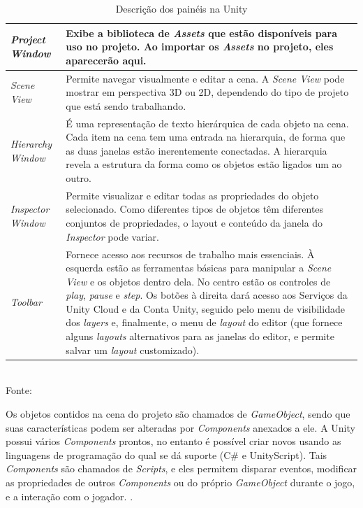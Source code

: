 \documentclass[
	12pt,					%
	openright,				%
	oneside,				%
	a4paper,				%
	bibjustif,				%
	chapter=TITLE,			%
	english,				%
	brazil,					%
	]{abntex2}
\newcommand{\source}[1]{\small Fonte: {#1}}
\begin{document}
			\begin{table}[ht]
				\caption{Descrição dos painéis na Unity}
				\centering
				\small
				\renewcommand{\arraystretch}{1.2} %
				\begin{tabular}{m{3.2cm} m{11.8cm}}
					\hline 
					\textit{Project Window} & Exibe a biblioteca de \textit{Assets} que estão disponíveis para uso no projeto. Ao importar os \textit{Assets} no projeto, eles aparecerão aqui. \\ 
					\hline 
					\textit{Scene View} & Permite navegar visualmente e editar a cena. A \textit{Scene View} pode mostrar em perspectiva 3D ou 2D, dependendo do tipo de projeto que está sendo trabalhando. \\ 
					\hline 
					\textit{Hierarchy Window} & É uma representação de texto hierárquica de cada objeto na cena. Cada item na cena tem uma entrada na hierarquia, de forma que as duas janelas estão inerentemente conectadas. A hierarquia revela a estrutura da forma como os objetos estão ligados um ao outro. \\ 
					\hline 
					\textit{Inspector Window} & Permite visualizar e editar todas as propriedades do objeto selecionado. Como diferentes tipos de objetos têm diferentes conjuntos de propriedades, o layout e conteúdo da janela do \textit{Inspector} pode variar. \\ 
					\hline 
					\textit{Toolbar} & Fornece acesso aos recursos de trabalho mais essenciais. À esquerda estão as ferramentas básicas para manipular a \textit{Scene View} e os objetos dentro dela. No centro estão os controles de \textit{play}, \textit{pause} e \textit{step}. Os botões à direita dará acesso aos Serviços da Unity Cloud e da Conta Unity, seguido pelo menu de visibilidade dos \textit{layers} e, finalmente, o menu de \textit{layout} do editor (que fornece alguns \textit{layouts} alternativos para as janelas do editor, e permite salvar um \textit{layout} customizado). \\ 
					\hline 
				\end{tabular}\\
				\vspace{3mm}
				\source{}
				\label{tab:unity}
			\end{table}
			
			Os objetos contidos na cena do projeto são chamados de \textit{GameObject},
			sendo que suas características podem ser alteradas por \textit{Components} anexados a ele.
			A Unity possui vários \textit{Components} prontos,
			no entanto é possível criar novos usando as linguagens de programação do qual se dá suporte (C\# e UnityScript).
			Tais \textit{Components} são chamados de \textit{Scripts},
			e eles permitem disparar eventos,
			modificar as propriedades de outros \textit{Components} ou do próprio \textit{GameObject} durante o jogo,
			e a interação com o jogador.
			\cite{unityScripts}.
\end{document}
